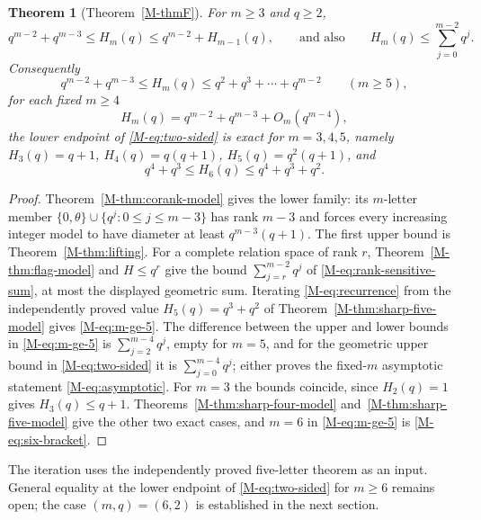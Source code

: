 \documentclass[11pt,reqno]{amsart}
\theoremstyle{plain}
\newtheorem{theorem}{Theorem}[section]
\theoremstyle{definition}
\theoremstyle{plain}
\theoremstyle{plain}
\theoremstyle{plain}
\theoremstyle{plain}
\theoremstyle{plain}
\theoremstyle{plain}
\theoremstyle{definition}
\theoremstyle{definition}
\theoremstyle{definition}
\theoremstyle{plain}
\begin{document}
\begin{theorem}[Theorem~\ref{M-thmF}]\label{M-thm:general-bounds}
For $m\ge3$ and $q\ge2$,
\begin{equation}\label{M-eq:two-sided}
 q^{m-2}+q^{m-3}\le H_m(q)\le q^{m-2}+H_{m-1}(q),
 \qquad\text{and also}\qquad H_m(q)\le\sum_{j=0}^{m-2}q^j .
\end{equation}
Consequently
\begin{equation}\label{M-eq:m-ge-5}
 q^{m-2}+q^{m-3}\le H_m(q)\le q^2+q^3+\cdots+q^{m-2}\qquad(m\ge5),
\end{equation}
for each fixed $m\ge4$
\begin{equation}\label{M-eq:asymptotic}
 H_m(q)=q^{m-2}+q^{m-3}+O_m(q^{m-4}),
\end{equation}
the lower endpoint of \eqref{M-eq:two-sided} is exact for $m=3,4,5$, namely
$H_3(q)=q+1$, $H_4(q)=q(q+1)$, $H_5(q)=q^2(q+1)$, and
\begin{equation}\label{M-eq:six-bracket}
 q^4+q^3\le H_6(q)\le q^4+q^3+q^2 .
\end{equation}
\end{theorem}
\begin{proof}
Theorem~\ref{M-thm:corank-model} gives the lower family: its $m$-letter
member $\{0,\theta\}\cup\{q^j:0\le j\le m-3\}$ has rank $m-3$ and forces every
increasing integer model to have diameter at least $q^{m-3}(q+1)$. The first
upper bound is Theorem~\ref{M-thm:lifting}. For a complete relation space of
rank $r$, Theorem~\ref{M-thm:flag-model} and $H\le q^r$ give the bound
$\sum_{j=r}^{m-2}q^j$ of \eqref{M-eq:rank-sensitive-sum}, at most the displayed
geometric sum. Iterating \eqref{M-eq:recurrence} from the independently proved
value $H_5(q)=q^3+q^2$ of Theorem~\ref{M-thm:sharp-five-model} gives
\eqref{M-eq:m-ge-5}. The difference between the upper and lower bounds in
\eqref{M-eq:m-ge-5} is $\sum_{j=2}^{m-4}q^j$, empty for $m=5$, and for
the geometric upper bound in \eqref{M-eq:two-sided} it is $\sum_{j=0}^{m-4}q^j$; either proves the fixed-$m$
asymptotic statement \eqref{M-eq:asymptotic}. For $m=3$ the bounds coincide,
since $H_2(q)=1$ gives $H_3(q)\le q+1$. Theorems~\ref{M-thm:sharp-four-model}
and~\ref{M-thm:sharp-five-model} give the other two exact cases, and $m=6$ in
\eqref{M-eq:m-ge-5} is \eqref{M-eq:six-bracket}.
\end{proof}

The iteration uses the independently proved five-letter theorem as an input.
General equality at the lower endpoint of \eqref{M-eq:two-sided} for $m\ge6$
remains open; the case $(m,q)=(6,2)$ is established in the next section.
\end{document}
